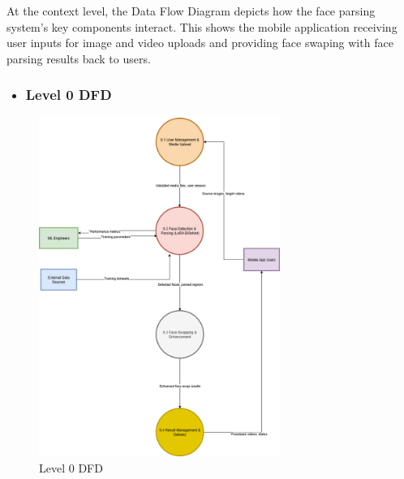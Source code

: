 \documentclass[12pt,a4paper]{report}
\begin{document}
At the context level, the Data Flow Diagram depicts how the face parsing system's key components interact. This shows the mobile application receiving user inputs for image and video uploads and providing face swaping with face parsing results back to users.

\begin{itemize}
    \item \subsubsection{Level 0 DFD}
\end{itemize}

\begin{figure}[H]
\centering
\includegraphics[width=0.7\textwidth]{figures/level_0_dfd.png}
\caption{Level 0 DFD}
\label{fig:level0_dfd}
\end{figure}
\end{document}
